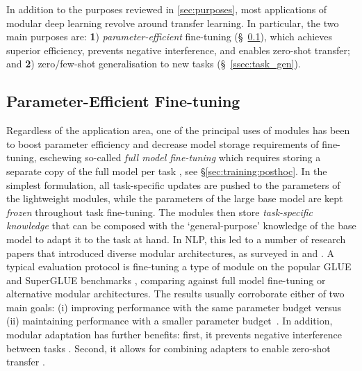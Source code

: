 In addition to the purposes reviewed in \cref{sec:purposes}, most applications of modular deep learning revolve around transfer learning. In particular, the two main purposes are: \textbf{1}) \textit{parameter-efficient} fine-tuning (\S~\ref{ssec:eff_ft}), which achieves superior efficiency, prevents negative interference, and enables zero-shot transfer; and \textbf{2}) zero/few-shot generalisation to new tasks (\S~\ref{ssec:task_gen}).


\subsection{Parameter-Efficient Fine-tuning} 
\label{ssec:eff_ft}
Regardless of the application area, one of the principal uses of modules has been to boost parameter efficiency and decrease model storage requirements of fine-tuning, eschewing so-called \textit{full model fine-tuning} which requires storing a separate copy of the full model per task \citep{Howard2018ulmfit,Devlin:2019bert}, see \S\ref{sec:training:posthoc}. In the simplest formulation, all task-specific updates are pushed to the parameters of the lightweight modules, while the parameters of the large base model are kept \textit{frozen} throughout task fine-tuning. The modules then store \textit{task-specific knowledge} that can be composed with the `general-purpose' knowledge of the base model to adapt it to the task at hand. 
In NLP, this led to a number of research papers that introduced diverse modular architectures, as surveyed in  and . A typical evaluation protocol is fine-tuning a type of module on the popular GLUE and SuperGLUE  benchmarks \citep{Wang:2019superglue}, comparing against full model fine-tuning or alternative modular architectures. The results usually corroborate either of two main goals: (i) improving performance with the same parameter budget versus (ii) maintaining performance with a smaller parameter budget~\citep{Mahabadi2021Compacter,han:2023autopeft}. In addition, modular adaptation has further benefits: first, it prevents negative interference between tasks \citep{Bapna2019Adapters}. Second, it allows for combining adapters to enable zero-shot transfer \citep{pfeiffer-etal-2020-mad}.

